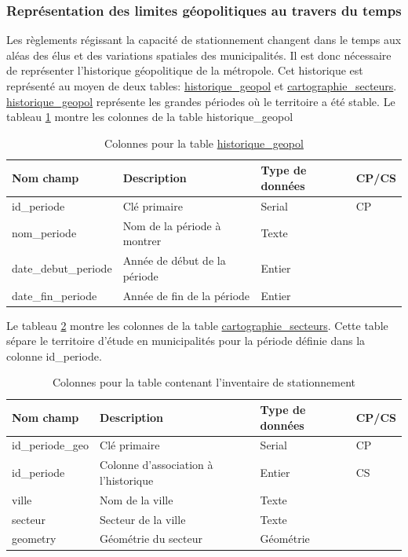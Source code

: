     \subsubsection{Représentation des limites géopolitiques au travers du temps} 
    Les règlements régissant la capacité de stationnement changent dans le temps aux aléas des élus et des variations spatiales des municipalités. Il est donc nécessaire de représenter l'historique géopolitique de la métropole. Cet historique est représenté au moyen de deux tables: \underline{historique\_geopol} et \underline{cartographie\_secteurs}. \underline{historique\_geopol} représente les grandes périodes où le territoire a été stable. 
    Le tableau \ref{tab:definition_historique_geopol} montre les colonnes de la table {historique\_geopol} \par
    \begin{table}[h]
       \centering
       \begin{tabular}{m{}|m{}m{}m{}}
            \hline
            Nom champ & Description & Type de données & CP/CS  \\
            \hline
            id\_periode & Clé primaire  & Serial & CP \\ \hline
            nom\_periode & Nom de la période à montrer & Texte & \\ \hline
            date\_debut\_periode & Année de début de la période & Entier & \\ \hline
            date\_fin\_periode & Année de fin de la période& Entier & \\ 
            \hline
       \end{tabular}
       \caption{Colonnes pour la table \underline{historique\_geopol}}
       \label{tab:definition_historique_geopol}
   \end{table}\FloatBarrier
   Le tableau \ref{tab:definition_cartographie_secteurs} montre les colonnes de la table \underline{cartographie\_secteurs}. Cette table sépare le territoire d'étude en municipalités pour la période définie dans la colonne id\_periode.\par
    \begin{table}[h]
       \centering
       \begin{tabular}{m{}|m{}m{}m{}}
            \hline
            Nom champ & Description & Type de données & CP/CS  \\
            \hline
            id\_periode\_geo & Clé primaire  & Serial & CP \\ 
            id\_periode & Colonne d'association à l'historique & Entier & CS\\ 
            ville & Nom de la ville & Texte & \\ 
            secteur & Secteur de la ville & Texte & \\ 
            geometry & Géométrie du secteur & Géométrie & \\
            \hline
       \end{tabular}
       \caption{Colonnes pour la table contenant l'inventaire de stationnement}
       \label{tab:definition_cartographie_secteurs}
    \end{table}
